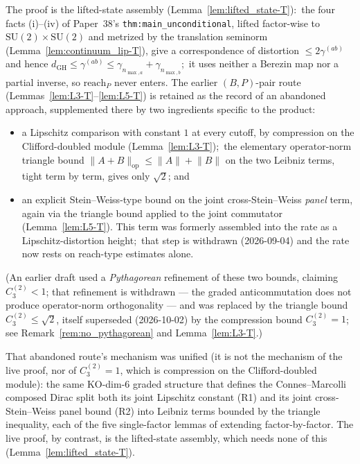 \documentclass[11pt,a4paper]{article}
\theoremstyle{plain}
\theoremstyle{definition}
\newcommand{\nmaxa}{n_{\max,a}}
\newcommand{\nmaxb}{n_{\max,b}}
\newcommand{\norm}[1]{\lVert #1 \rVert}
\newcommand{\SU}{\mathrm{SU}}
\begin{document}
The proof is the lifted-state assembly (Lemma~\ref{lem:lifted_state-T}):\
the four facts (i)--(iv) of Paper~38's \texttt{thm:main\_unconditional},
lifted factor-wise to $\SU(2)\times\SU(2)$ and metrized by the translation
seminorm (Lemma~\ref{lem:continuum_lip-T}), give a correspondence of
distortion $\le 2\gamma^{(ab)}$ and hence $d_{\mathrm{GH}} \le \gamma^{(ab)}
\le \gamma_{\nmaxa}+\gamma_{\nmaxb}$;\ it uses neither a Berezin map nor a
partial inverse, so $\mathrm{reach}_P$ never enters. The earlier
$(B,P)$-pair route (Lemmas~\ref{lem:L3-T}--\ref{lem:L5-T}) is retained as the
record of an abandoned approach, supplemented there by two ingredients
specific to the product:
\begin{itemize}\setlength{\itemsep}{2pt}
\item a Lipschitz comparison with constant $1$ at every cutoff, by
compression on the Clifford-doubled module (Lemma~\ref{lem:L3-T});\ the
elementary operator-norm triangle bound $\norm{A + B}_{\mathrm{op}} \le
\norm{A} + \norm{B}$ on the two Leibniz terms, tight term by term, gives
only $\sqrt 2$; and
\item an explicit Stein--Weiss-type bound on the joint
cross-Stein--Weiss \emph{panel} term, again via the triangle bound
applied to the joint commutator (Lemma~\ref{lem:L5-T}). This term was
formerly assembled into the rate as a Lipschitz-distortion height;\ that
step is withdrawn (2026-09-04) and the rate now rests on reach-type
estimates alone.
\end{itemize}
(An earlier draft used a \emph{Pythagorean} refinement of these two
bounds, claiming $C_3^{(2)} < 1$; that refinement is withdrawn --- the
graded anticommutation does not produce operator-norm orthogonality
--- and was replaced by the triangle bound $C_3^{(2)} \le \sqrt 2$, itself
superseded (2026-10-02) by the compression bound $C_3^{(2)} = 1$; see
Remark~\ref{rem:no_pythagorean} and Lemma~\ref{lem:L3-T}.)

That abandoned route's mechanism was unified (it is not the mechanism of
the live proof, nor of $C_3^{(2)} = 1$, which is compression on the
Clifford-doubled module): the same KO-dim-6 graded
structure that defines the Connes--Marcolli composed Dirac split both
its joint Lipschitz constant (R1) and its joint cross-Stein--Weiss
panel bound (R2) into Leibniz terms bounded by the triangle inequality, each
of the five single-factor lemmas of \cite{loutey_paper38} extending
factor-by-factor. The live proof, by contrast, is the lifted-state
assembly, which needs none of this (Lemma~\ref{lem:lifted_state-T}).
\end{document}
